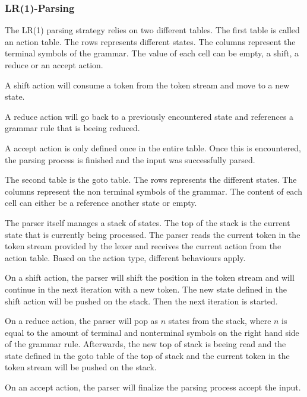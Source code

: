\subsubsection{LR(1)-Parsing}

The LR(1) parsing strategy relies on two different tables. The first table is called an action table. The rows represents different states. The columns represent the terminal symbols of the grammar. The value of each cell can be empty, a shift, a reduce or an accept action. 

A shift action will consume a token from the token stream and move to a new state.

A reduce action will go back to a previously encountered state and references a grammar rule that is beeing reduced.

A accept action is only defined once in the entire table. Once this is encountered, the parsing process is finished and the input was successfully parsed.

The second table is the goto table. The rows represents the different states. The columns represent the non terminal symbols of the grammar. The content of each cell can either be a reference another state or empty.

The parser itself manages a stack of states. The top of the stack is the current state that is currently being processed. The parser reads the current token in the token stream provided by the lexer and receives the current action from the action table.
Based on the action type, different behaviours apply.

On a shift action, the parser will shift the position in the token stream and will continue in the next iteration with a new token. The new state defined in the shift action will be pushed on the stack. Then the next iteration is started.

On a reduce action, the parser will pop as $n$ states from the stack, where $n$ is equal to the amount of terminal and nonterminal symbols on the right hand side of the grammar rule. Afterwards, the new top of stack is beeing read and the state defined in the goto table of the top of stack and the current token in the token stream will be pushed on the stack.

On an accept action, the parser will finalize the parsing process accept the input. 
